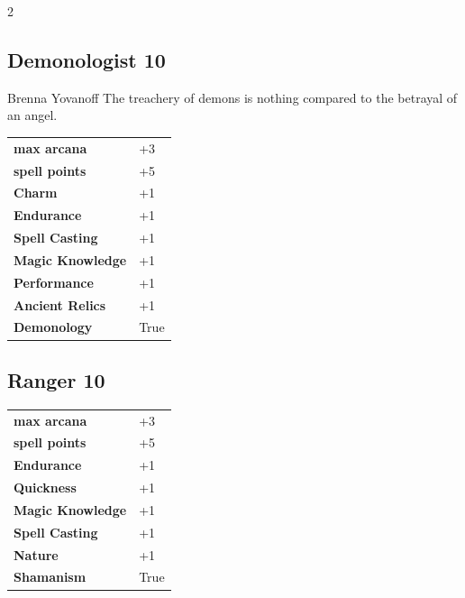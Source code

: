 \begin{multicols}{2}
\begin{tcolorbox}

\end{tcolorbox}

\begin{tcolorbox}
    \subsection*{Demonologist \hfill \small{10 }}
    \tcblower


\begin{pquote}{Brenna Yovanoff}
The treachery of demons is nothing compared to the betrayal of an angel.
\end{pquote}

\vspace{3mm}

\begin{tabular}{@{}ll@{}}
    \textbf{max arcana} & +3\\
    \textbf{spell points} & +5\\
    \textbf{Charm} & +1\\
    \textbf{Endurance} & +1\\
    \textbf{Spell Casting} & +1\\
    \textbf{Magic Knowledge} & +1\\
    \textbf{Performance} & +1\\
    \textbf{Ancient Relics} & +1\\
    \textbf{Demonology} & True\\
\end{tabular}


\end{tcolorbox}

\begin{tcolorbox}
    \subsection*{Ranger \hfill \small{10 }}
    \tcblower




\begin{tabular}{@{}ll@{}}
    \textbf{max arcana} & +3\\
    \textbf{spell points} & +5\\
    \textbf{Endurance} & +1\\
    \textbf{Quickness} & +1\\
    \textbf{Magic Knowledge} & +1\\
    \textbf{Spell Casting} & +1\\
    \textbf{Nature} & +1\\
    \textbf{Shamanism} & True\\
\end{tabular}


\end{tcolorbox}
\end{multicols}
